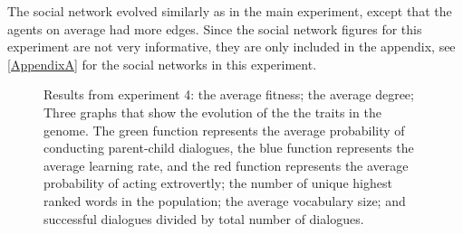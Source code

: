 The social network evolved similarly as in the main experiment, except that the agents on average had more edges. Since the social network figures for this experiment are not very informative, they are only included in the appendix, see \ref{AppendixA} for the social networks in this experiment.
\begin{figure}[b]\setcounter{subfigure}{0}
    \centering
    \hfill
    \caption[Graphs of the results from experiment 4 as a function of number of generations.]{Results from experiment 4:  the average fitness;  the average degree;  Three graphs that show the evolution of the the traits in the genome. The green function represents the average probability of conducting parent-child dialogues, the blue function represents the average learning rate, and the red function represents the average probability of acting extrovertly;  the number of unique highest ranked words in the population;  the average vocabulary size; and  successful dialogues divided by total number of dialogues.}
    \label{fig:exp4.0}
\end{figure}
%
